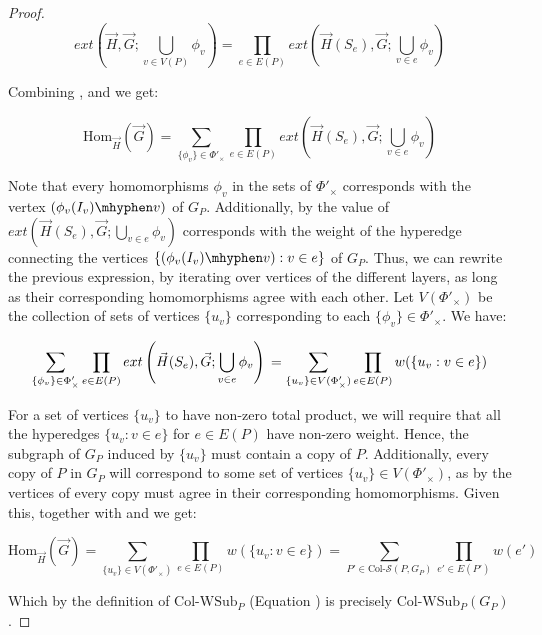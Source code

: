 \documentclass[a4paper,UKenglish,cleveref, autoref, numberwithinsect, thm-restate]{lipics-v2021}
\newcommand{\reduced}[1]{G_{#1}}
\newcommand{\colSetSub}{\text{Col-}\cS}
\newcommand{\extension}[3]{ext\left(#1,#2;#3\right)}
\newcommand{\WSub}[2]{\mathrm{\text{Col-WSub}}_{#2}(#1)}
\newcommand{\WSubNI}[1]{\mathrm{\text{Col-WSub}}_{#1}}
\newcommand{\Hom}[2]{\mathrm{Hom}_{#2}(#1)}
\newcommand{\cS}{\mathcal{S}}
\begin{document}
\begin{proof}
		\begin{equation}\label{eq:step2}
			\extension{\vec{H}}{\vec{G}}{\bigcup_{v \in V(P)} \phi_v} = 
			\prod_{e\in E(P)} \extension{\vec{H}(S_e)}{\vec{G}}{\bigcup_{v \in e} \phi_v}
		\end{equation}
		
		Combining ,  and  we get:
		
		\begin{equation} \label{eq:step3}
			\Hom{\vec{G}}{\vec{H}} = 
			\sum_{\{\phi_v \} \in \Phi'_\times}
			\prod_{e\in E(P)} \extension{\vec{H}(S_e)}{\vec{G}}{\bigcup_{v \in e} \phi_v}
		\end{equation}
		
		Note that every homomorphisms $\phi_v$ in the sets of $\Phi'_\times$ corresponds with the vertex $(\phi_v(I_v)\mhyphen v)$ of $\reduced{P}$. Additionally, by  the value of $\extension{\vec{H}(S_e)}{\vec{G}}{\bigcup_{v \in e} \phi_v}$ corresponds with the weight of the hyperedge connecting the vertices $\{(\phi_v(I_v)\mhyphen v) : v\in e\}$ of $\reduced{P}$. Thus, we can rewrite the previous expression, by iterating over vertices of the different layers, as long as their corresponding homomorphisms agree with each other. Let $V(\Phi'_\times)$ be the collection of sets of vertices $\{u_v\}$ corresponding to each $\{\phi_v\} \in \Phi'_\times$. We have:
		
		\begin{equation}\label{eq:step4}
				\sum_{\{\phi_v \} \in \Phi'_\times}
				\prod_{e\in E(P)} \extension{\vec{H}(S_e)}{\vec{G}}{\bigcup_{v \in e} \phi_v} \\
				= \sum_{\{u_v \} \in V(\Phi'_\times)} 
				\prod_{e\in E(P)} w(\{u_v: v\in e\})
		\end{equation}
		
		For a set of vertices $\{u_v\}$ to have non-zero total product, we will require that all the hyperedges $\{u_v: v\in e\}$ for $e\in E(P)$ have non-zero weight. Hence, the subgraph of $\reduced{P}$ induced by $\{u_v\}$ must contain a copy of $P$. Additionally, every copy of $P$ in $\reduced{P}$ will correspond to some set of vertices $\{u_v \} \in V(\Phi'_\times)$, as by  the vertices of every copy must agree in their corresponding homomorphisms. Given this, together with  and  we get:
		
		\begin{equation}
			\Hom{\vec{G}}{\vec{H}}  
			= \sum_{\{u_v \} \in V(\Phi'_\times)} 
			\prod_{e\in E(P)} w(\{u_v: v\in e\})
			=\sum_{P' \in \colSetSub(P,\reduced{P})} \prod_{e'\in E(P')} w(e')
		\end{equation}
		
		Which by the definition of $\WSubNI{P}$ (Equation ) is precisely $\WSub{\reduced{P}}{P}$.
		
	\end{proof}
\end{document}
